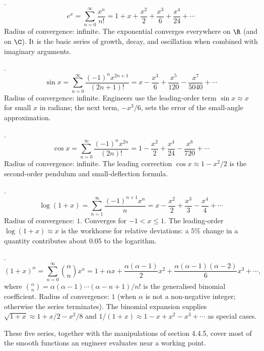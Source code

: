 .
\[
e^{x} = \sum_{n=0}^{\infty} \frac{x^{n}}{n!} = 1 + x + \frac{x^{2}}{2}
+ \frac{x^{3}}{6} + \frac{x^{4}}{24} + \cdots
\]
Radius of convergence: infinite. The exponential converges everywhere
on $\R$ (and on $\C$). It is the basic series of growth, decay, and
oscillation when combined with imaginary arguments.

.
\[
\sin x = \sum_{n=0}^{\infty} \frac{(-1)^{n} x^{2n+1}}{(2n+1)!} = x
- \frac{x^{3}}{6} + \frac{x^{5}}{120} - \frac{x^{7}}{5040} + \cdots
\]
Radius of convergence: infinite. Engineers use the leading-order term
$\sin x \approx x$ for small $x$ in radians; the next term, $-x^{3}/6$,
sets the error of the small-angle approximation.

.
\[
\cos x = \sum_{n=0}^{\infty} \frac{(-1)^{n} x^{2n}}{(2n)!} = 1
- \frac{x^{2}}{2} + \frac{x^{4}}{24} - \frac{x^{6}}{720} + \cdots
\]
Radius of convergence: infinite. The leading correction $\cos x
\approx 1 - x^{2}/2$ is the second-order pendulum and small-deflection
formula.

.
\[
\log(1 + x) = \sum_{n=1}^{\infty} \frac{(-1)^{n+1} x^{n}}{n} = x
- \frac{x^{2}}{2} + \frac{x^{3}}{3} - \frac{x^{4}}{4} + \cdots
\]
Radius of convergence: $1$. Converges for $-1 < x \leq 1$. The
leading-order $\log(1 + x) \approx x$ is the workhorse for relative
deviations: a $5\%$ change in a quantity contributes about $0.05$ to
the logarithm.

.
\[
(1 + x)^{\alpha} = \sum_{n=0}^{\infty} \binom{\alpha}{n} x^{n} = 1
+ \alpha x + \frac{\alpha (\alpha - 1)}{2} x^{2} + \frac{\alpha
(\alpha - 1)(\alpha - 2)}{6} x^{3} + \cdots,
\]
where $\binom{\alpha}{n} = \alpha(\alpha - 1) \cdots (\alpha - n +
1)/n!$ is the generalised binomial coefficient. Radius of convergence:
$1$ (when $\alpha$ is not a non-negative integer; otherwise the series
terminates). The binomial expansion supplies $\sqrt{1 + x} \approx 1 +
x/2 - x^{2}/8$ and $1/(1 + x) \approx 1 - x + x^{2} - x^{3} + \cdots$
as special cases.

These five series, together with the manipulations of section 4.4.5,
cover most of the smooth functions an engineer evaluates near a
working point.

